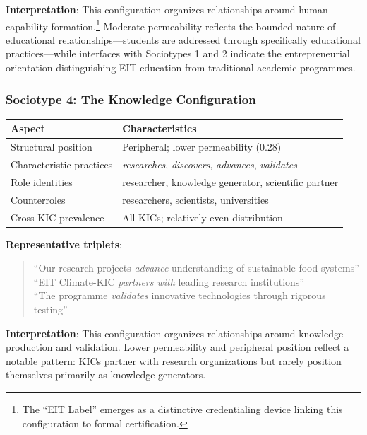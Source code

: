 \documentclass[../main.tex]{subfiles}
\begin{document}
\textbf{Interpretation}: This configuration organizes relationships around human capability formation.\footnote{The ``EIT Label'' emerges as a distinctive credentialing device linking this configuration to formal certification.} Moderate permeability reflects the bounded nature of educational relationships---students are addressed through specifically educational practices---while interfaces with Sociotypes 1 and 2 indicate the entrepreneurial orientation distinguishing EIT education from traditional academic programmes.

\subsubsection{Sociotype 4: The Knowledge Configuration}

\begin{center}
\small
\begin{tabular}{ll}
\toprule
\textbf{Aspect} & \textbf{Characteristics} \\
\midrule
Structural position & Peripheral; lower permeability (0.28) \\
Characteristic practices & \textit{researches}, \textit{discovers}, \textit{advances}, \textit{validates} \\
Role identities & researcher, knowledge generator, scientific partner \\
Counterroles & researchers, scientists, universities \\
Cross-KIC prevalence & All KICs; relatively even distribution \\
\bottomrule
\end{tabular}
\end{center}

\textbf{Representative triplets}:
\begin{quote}
\small
``Our research projects \textit{advance} understanding of sustainable food systems''\\
``EIT Climate-KIC \textit{partners with} leading research institutions''\\
``The programme \textit{validates} innovative technologies through rigorous testing''
\end{quote}

\textbf{Interpretation}: This configuration organizes relationships around knowledge production and validation. Lower permeability and peripheral position reflect a notable pattern: KICs partner with research organizations but rarely position themselves primarily as knowledge generators.
\end{document}
